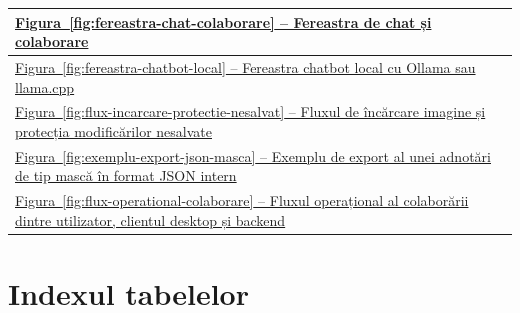 \begin{table}[!htbp]
\begin{tabular}{|p{}|p{}|}
        \hyperref[fig:fereastra-chat-colaborare]{Figura~\ref*{fig:fereastra-chat-colaborare} -- Fereastra de chat și colaborare} &
        \pageref{fig:fereastra-chat-colaborare} \\
        \hline
        \hyperref[fig:fereastra-chatbot-local]{Figura~\ref*{fig:fereastra-chatbot-local} -- Fereastra chatbot local cu Ollama sau llama.cpp} &
        \pageref{fig:fereastra-chatbot-local} \\
        \hline
        \hyperref[fig:flux-incarcare-protectie-nesalvat]{Figura~\ref*{fig:flux-incarcare-protectie-nesalvat} -- Fluxul de încărcare imagine și protecția modificărilor nesalvate} &
        \pageref{fig:flux-incarcare-protectie-nesalvat} \\
        \hline
        \hyperref[fig:exemplu-export-json-masca]{Figura~\ref*{fig:exemplu-export-json-masca} -- Exemplu de export al unei adnotări de tip mască în format JSON intern} &
        \pageref{fig:exemplu-export-json-masca} \\
        \hline
        \hyperref[fig:flux-operational-colaborare]{Figura~\ref*{fig:flux-operational-colaborare} -- Fluxul operațional al colaborării dintre utilizator, clientul desktop și backend} &
        \pageref{fig:flux-operational-colaborare} \\
        \hline
    \end{tabular}
    \label{tab:provenienta-figuri-implementare}
\end{table}

\chapter{Indexul tabelelor}
\label{anexa:index-tabele}

